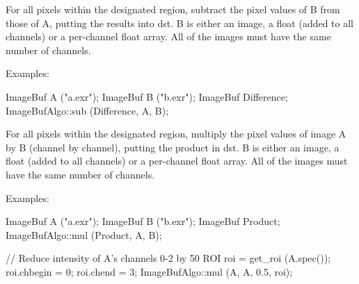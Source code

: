  

For all pixels within the designated region, subtract the pixel values
of {\cf B} from those of {\cf A}, putting the results into {\cf dst}.
{\cf B} is either an image,
a float (added to all channels) or a per-channel float array.
All of the images must have the same number of channels.

\smallskip
\noindent Examples:
\begin{code}
    ImageBuf A ("a.exr");
    ImageBuf B ("b.exr");
    ImageBuf Difference;
    ImageBufAlgo::sub (Difference, A, B);
\end{code}
\apiend



 

For all pixels within the designated region, multiply the pixel values
of image {\cf A} by {\cf B} (channel by channel), putting the product in
{\cf dst}.  {\cf B} is either an image,
a float (added to all channels) or a per-channel float array.
All of the images must have the same number of channels.

\smallskip
\noindent Examples:
\begin{code}
    ImageBuf A ("a.exr");
    ImageBuf B ("b.exr");
    ImageBuf Product;
    ImageBufAlgo::mul (Product, A, B);

    // Reduce intensity of A's channels 0-2 by 50%
    ROI roi = get_roi (A.spec());
    roi.chbegin = 0;  roi.chend = 3;
    ImageBufAlgo::mul (A, A, 0.5, roi);
\end{code}
\apiend


